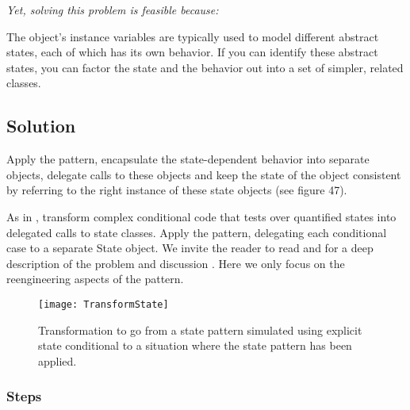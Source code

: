 \documentclass[a4paper,10pt,twoside]{book}
\begin{document}
\emph{Yet, solving this problem is feasible because:}

\begin{bulletlist}
\item The object's instance variables are typically used to model different abstract states, each of which has its own behavior. If you can identify these abstract states, you can factor the state and the behavior out into a set of simpler, related classes.
\end{bulletlist}

\subsection*{Solution}

Apply the  pattern, \ie encapsulate the state-dependent behavior into separate objects, delegate calls to these objects and keep the state of the object consistent by referring to the right instance of these state objects (see figure 47). 

As in , transform complex conditional code that tests over quantified states into delegated calls to state classes. Apply the  pattern, delegating each conditional case to a separate State object. We invite the reader to read  and  for a deep description of the problem and discussion \cite{Gamm95a} \cite{Alpe98a} \cite{Dyso97a}. Here we only focus on the reengineering aspects of the pattern.

\begin{figure}
\begin{center}
\texttt{[image: TransformState]}
\caption{Transformation to go from a state pattern simulated using explicit state conditional to a situation where the state pattern has been applied.}
\end{center}
\end{figure}

\subsubsection*{Steps}
\end{document}
